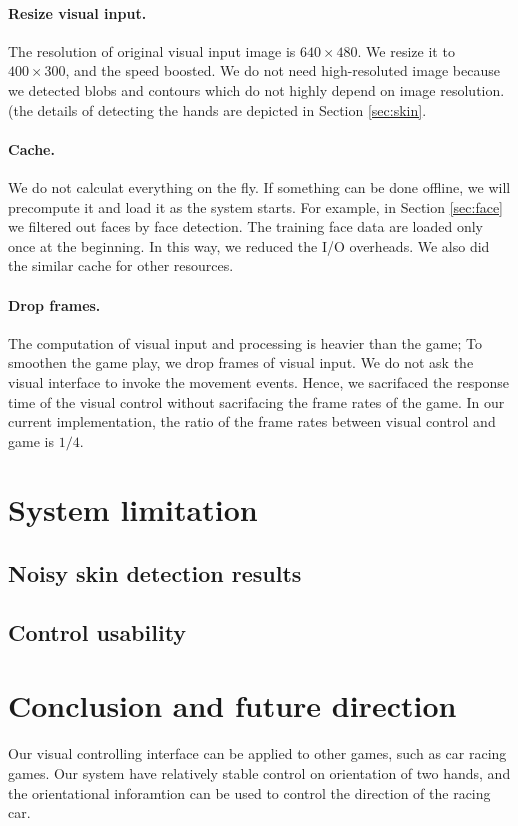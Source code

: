 \documentclass[10pt,twocolumn,letterpaper]{article}
\begin{document}
\paragraph{Resize visual input.} The resolution of 
original visual input image is $640 \times 480$. 
We resize it to $400 \times 300$, and the speed boosted.
We do not need high-resoluted image because we detected 
blobs and contours which do not highly depend on image resolution. 
(the details of detecting the hands are depicted in Section 
\ref{sec:skin}.

\paragraph{Cache.} We do not calculat everything on the fly. 
If something can be done offline, we will precompute it and 
load it as the system starts. For example, in Section 
\ref{sec:face} we filtered out faces by face detection. 
The training face data are loaded only once at the beginning. 
In this way, we reduced the I/O overheads. We also did the 
similar cache for other resources.

\paragraph{Drop frames.} The computation of visual input 
and processing is heavier than the game; To smoothen the game 
play, we drop frames of visual input. We do not ask 
the visual interface to invoke the movement events. 
Hence, we sacrifaced the response time of the visual control 
without sacrifacing the frame rates of the game. In our 
current implementation, the ratio of the frame rates between 
visual control and game is $1/4$.

\section{System limitation}

\subsection{Noisy skin detection results}

\subsection{Control usability}

\section{Conclusion and future direction}
Our visual controlling interface can be applied to other games, 
such as car racing games. Our system have relatively stable control on 
orientation of two hands, and the orientational inforamtion can be 
used to control the direction of the racing car.

{\small


}
\end{document}

